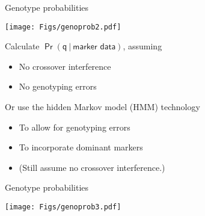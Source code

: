 \documentclass[12pt]{article}
\newcommand{\headsize}{\fontsize{35}{35} \selectfont}
\newcommand{\smallersize}{\fontsize{20}{25} \selectfont}
\begin{document}
\newpage

\addtocounter{page}{-1}

\headsize \color{myyellow}
\hfill \begin{minipage}{5.75in}
\centering
Genotype probabilities
\end{minipage}

\vspace{15mm}

\centerline{\texttt{[image: Figs/genoprob2.pdf]}}

\vspace{15mm}

\hfill
\begin{minipage}{10in}
\color{mywhite} \smallersize
Calculate {\color{myblue} $\mathsf{\Pr(q \ | \ \text{marker data})}$}, assuming
\begin{itemize}
\item No crossover interference
\item No genotyping errors
\end{itemize}

\vspace{10mm}

Or use the {\color{mypink} hidden Markov model (HMM)} technology
\begin{itemize}
\item To allow for genotyping errors
\item To incorporate dominant markers
\item {\color{myblue} (Still assume no crossover interference.)}
\end{itemize}
\end{minipage}

\newpage

\addtocounter{page}{-1}

\headsize \color{myyellow}
\hfill \begin{minipage}{5.75in}
\centering
Genotype probabilities
\end{minipage}

\vspace{15mm}

\centerline{\texttt{[image: Figs/genoprob3.pdf]}}

\vspace{15mm}
\end{document}
